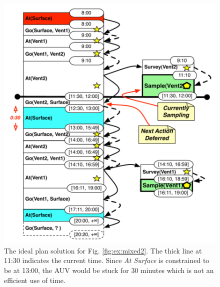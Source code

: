 \begin{figure}
  \centering
  \includegraphics[width=0.7\columnwidth]{figs/example_ideal}
  \caption{\small The ideal plan solution for Fig. \ref{fig:ex:mixed2}. The
  thick line at 11:30 indicates the current time. Since {\em At Surface} is
  constrained to be at 13:00, the AUV would be stuck for 30 minutes which is
  not an efficient use of time.}
  \label{fig:ex:ideal}
  \vskip-7mm
\end{figure}





